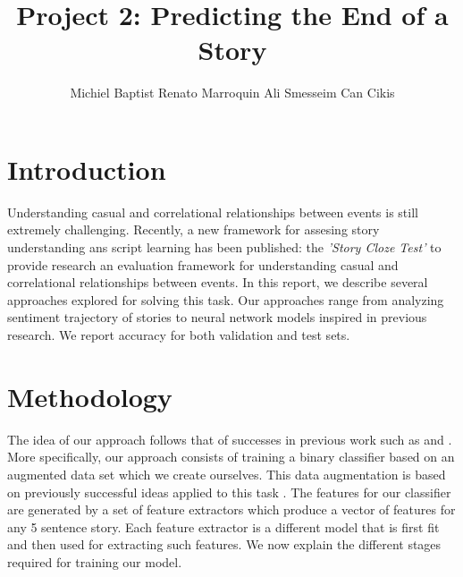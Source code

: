 \documentclass{article}
\title{Project 2: Predicting the End of a Story}
\author{Michiel Baptist \qquad Renato Marroquin \qquad Ali Smesseim \qquad Can Cikis}
\begin{document}

\maketitle



\section{Introduction}
\label{sec:intro}

Understanding casual and correlational relationships between events is
still extremely challenging. Recently, a new framework for assesing story
understanding ans script learning has been published: the {\it 'Story Cloze
    Test'} to provide research an evaluation framework for understanding casual
and correlational relationships between events. In this report, we describe
several approaches explored for solving this task. Our approaches
range from analyzing sentiment trajectory of stories to neural network models
inspired in previous research. We report accuracy for both validation
and test sets.


\section{Methodology}
\label{sec:general}

The idea of our approach follows that of successes in previous work such as
\cite{UWNLP} and \cite{COGCOMP}. More specifically, our approach
consists of training a binary classifier based on an augmented data set which we
create ourselves. This data augmentation is based on previously successful ideas
applied to this task \cite{LSTMClassifier}.  The features for our
classifier are generated by a set of feature extractors which produce a vector
of features for any 5 sentence story. Each feature extractor is a different
model that is first fit and then used for extracting such features. We now 
explain the different stages required for training our model.
\end{document}
